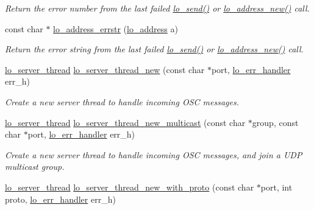 \begin{DoxyCompactItemize}
\begin{DoxyCompactList}\small\item\em \-Return the error number from the last failed \hyperlink{group__liblo_gafa4253874f97c2c16254ac57d2b7c987}{lo\-\_\-send()} or \hyperlink{group__liblo_gae5af61a02ab08871d3ea070c8f770cfe}{lo\-\_\-address\-\_\-new()} call. \end{DoxyCompactList}\item 
const char $\ast$ \hyperlink{group__liblo_gace321bfb9e529d8640e96e894db5400c}{lo\-\_\-address\-\_\-errstr} (\hyperlink{lo__types_8h_abf9b53223467de596b89e1377b0f3f3d}{lo\-\_\-address} a)
\begin{DoxyCompactList}\small\item\em \-Return the error string from the last failed \hyperlink{group__liblo_gafa4253874f97c2c16254ac57d2b7c987}{lo\-\_\-send()} or \hyperlink{group__liblo_gae5af61a02ab08871d3ea070c8f770cfe}{lo\-\_\-address\-\_\-new()} call. \end{DoxyCompactList}\item 
\hyperlink{lo__types_8h_a09996ffb6bde21b8fb6106897b88feae}{lo\-\_\-server\-\_\-thread} \hyperlink{group__liblo_gabe3e0c31189adfd7624de6c507b610ba}{lo\-\_\-server\-\_\-thread\-\_\-new} (const char $\ast$port, \hyperlink{lo__types_8h_aa5d2e4aa0ff9d4459fcc76e7ed5839fc}{lo\-\_\-err\-\_\-handler} err\-\_\-h)
\begin{DoxyCompactList}\small\item\em \-Create a new server thread to handle incoming \-O\-S\-C messages. \end{DoxyCompactList}\item 
\hyperlink{lo__types_8h_a09996ffb6bde21b8fb6106897b88feae}{lo\-\_\-server\-\_\-thread} \hyperlink{group__liblo_ga0fa9fcae4eabe09847d46b134dc33aa4}{lo\-\_\-server\-\_\-thread\-\_\-new\-\_\-multicast} (const char $\ast$group, const char $\ast$port, \hyperlink{lo__types_8h_aa5d2e4aa0ff9d4459fcc76e7ed5839fc}{lo\-\_\-err\-\_\-handler} err\-\_\-h)
\begin{DoxyCompactList}\small\item\em \-Create a new server thread to handle incoming \-O\-S\-C messages, and join a \-U\-D\-P multicast group. \end{DoxyCompactList}\item 
\hyperlink{lo__types_8h_a09996ffb6bde21b8fb6106897b88feae}{lo\-\_\-server\-\_\-thread} \hyperlink{group__liblo_ga6713cedfb0b2c4f066ec8a19366bf095}{lo\-\_\-server\-\_\-thread\-\_\-new\-\_\-with\-\_\-proto} (const char $\ast$port, int proto, \hyperlink{lo__types_8h_aa5d2e4aa0ff9d4459fcc76e7ed5839fc}{lo\-\_\-err\-\_\-handler} err\-\_\-h)

\end{DoxyCompactItemize}
